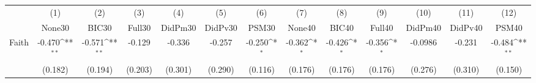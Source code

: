{
\def\sym#1{\ifmmode^{#1}\else\(^{#1}\)\fi}
\begin{tabular}{l*{12}{c}}
\toprule
            &\multicolumn{1}{c}{(1)}&\multicolumn{1}{c}{(2)}&\multicolumn{1}{c}{(3)}&\multicolumn{1}{c}{(4)}&\multicolumn{1}{c}{(5)}&\multicolumn{1}{c}{(6)}&\multicolumn{1}{c}{(7)}&\multicolumn{1}{c}{(8)}&\multicolumn{1}{c}{(9)}&\multicolumn{1}{c}{(10)}&\multicolumn{1}{c}{(11)}&\multicolumn{1}{c}{(12)}\\
            &\multicolumn{1}{c}{None30}&\multicolumn{1}{c}{BIC30}&\multicolumn{1}{c}{Full30}&\multicolumn{1}{c}{DidPm30}&\multicolumn{1}{c}{DidPv30}&\multicolumn{1}{c}{PSM30}&\multicolumn{1}{c}{None40}&\multicolumn{1}{c}{BIC40}&\multicolumn{1}{c}{Full40}&\multicolumn{1}{c}{DidPm40}&\multicolumn{1}{c}{DidPv40}&\multicolumn{1}{c}{PSM40}\\
\midrule
Faith       &      -0.470\sym{**} &      -0.571\sym{**} &      -0.129         &      -0.336         &      -0.257         &      -0.250\sym{*}  &      -0.362\sym{*}  &      -0.426\sym{*}  &      -0.356\sym{*}  &     -0.0986         &      -0.231         &      -0.484\sym{**} \\
            &     (0.182)         &     (0.194)         &     (0.203)         &     (0.301)         &     (0.290)         &     (0.116)         &     (0.176)         &     (0.176)         &     (0.176)         &     (0.276)         &     (0.310)         &     (0.150)         \\
\bottomrule
\end{tabular}
}
